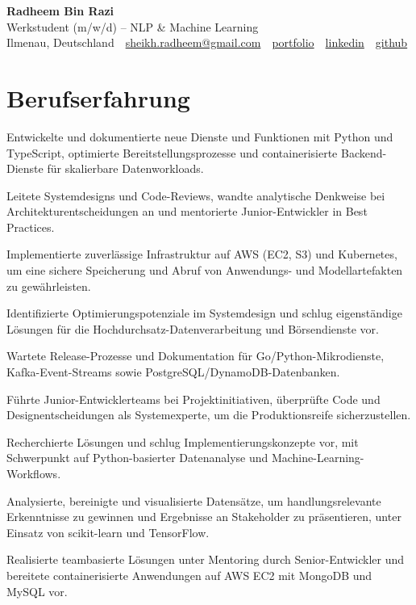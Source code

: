 \documentclass[11pt,a4paper]{resume}
\makeatletter
\newcommand{\Portfolio}{https://radheem.github.io/my-cv}
\newcommand{\PortfolioText}{portfolio}
\newcommand{\GitHub}{https://github.com/radheem}
\newcommand{\LinkedIn}{https://www.linkedin.com/in/radheem-razi}
\newcommand{\Email}{sheikh.radheem@gmail.com}
\makeatother
\begin{document}
\clearpage
{}

\begin{center}
  {\huge\bfseries Radheem Bin Razi}\\[3pt]
  {\large Werkstudent (m/w/d) – NLP \& Machine Learning}\\[6pt]
  \small
  Ilmenau, Deutschland \,\textbar\,
  \href{mailto:\Email}{\Email} \,\textbar\,
  \href{\Portfolio}{\PortfolioText} \,\textbar\,
  \href{\LinkedIn}{linkedin} \,\textbar\,
  \href{\GitHub}{github}
\end{center}
\vspace{2pt}

\section{Berufserfahrung}

\bullets
  \item Entwickelte und dokumentierte neue Dienste und Funktionen mit Python und TypeScript, optimierte Bereitstellungsprozesse und containerisierte Backend-Dienste für skalierbare Datenworkloads.
  \item Leitete Systemdesigns und Code-Reviews, wandte analytische Denkweise bei Architekturentscheidungen an und mentorierte Junior-Entwickler in Best Practices.
  \item Implementierte zuverlässige Infrastruktur auf AWS (EC2, S3) und Kubernetes, um eine sichere Speicherung und Abruf von Anwendungs- und Modellartefakten zu gewährleisten.
\bulletsend
\vspace{3pt}
\bullets
  \item Identifizierte Optimierungspotenziale im Systemdesign und schlug eigenständige Lösungen für die Hochdurchsatz-Datenverarbeitung und Börsendienste vor.
  \item Wartete Release-Prozesse und Dokumentation für Go/Python-Mikrodienste, Kafka-Event-Streams sowie PostgreSQL/DynamoDB-Datenbanken.
  \item Führte Junior-Entwicklerteams bei Projektinitiativen, überprüfte Code und Designentscheidungen als Systemexperte, um die Produktionsreife sicherzustellen.
\bulletsend
\vspace{3pt}
\bullets
  \item Recherchierte Lösungen und schlug Implementierungskonzepte vor, mit Schwerpunkt auf Python-basierter Datenanalyse und Machine-Learning-Workflows.
  \item Analysierte, bereinigte und visualisierte Datensätze, um handlungsrelevante Erkenntnisse zu gewinnen und Ergebnisse an Stakeholder zu präsentieren, unter Einsatz von scikit-learn und TensorFlow.
  \item Realisierte teambasierte Lösungen unter Mentoring durch Senior-Entwickler und bereitete containerisierte Anwendungen auf AWS EC2 mit MongoDB und MySQL vor.
\bulletsend
\vspace{3pt}
\end{document}
